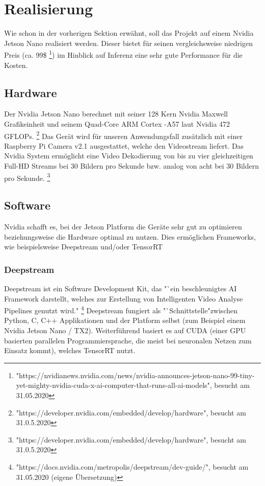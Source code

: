 \documentclass[a4paper,oneside,12pt]{report}
\begin{document}
	\chapter{Realisierung}
	\begin{onehalfspace}
		Wie schon in der vorherigen Sektion erwähnt, soll das Projekt auf einem Nvidia Jetson Nano realisiert werden. Dieser bietet für seinen vergleichsweise niedrigen Preis (ca. 99\$
		\footnote{"https://nvidianews.nvidia.com/news/nvidia-announces-jetson-nano-99-tiny-yet-mighty-nvidia-cuda-x-ai-computer-that-runs-all-ai-models", besucht am 31.05.2020})
		im Hinblick auf Inferenz eine sehr gute Performance für die Kosten.
		\section{Hardware}
		Der Nvidia Jetson Nano berechnet mit seiner 128 Kern Nvidia Maxwell Grafikeinheit und seinem Quad-Core ARM Cortex -A57 laut Nvidia 472 GFLOPs.
		\footnote{"https://developer.nvidia.com/embedded/develop/hardware", besucht am 31.0.5.2020}
		Das Gerät wird für unseren Anwendungsfall zusätzlich mit einer Raspberry Pi Camera v2.1 ausgestattet, welche den Videostream liefert. Das Nvidia System ermöglicht eine Video Dekodierung von bis zu vier gleichzeitigen Full-HD Streams bei 30 Bildern pro Sekunde bzw. analog von acht bei 30 Bildern pro Sekunde.
		\footnote{"https://developer.nvidia.com/embedded/develop/hardware", besucht am 31.0.5.2020}
		\section{Software}
		Nvidia schafft es, bei der Jetson Platform die Geräte sehr gut zu optimieren beziehungsweise die Hardware optimal zu nutzen. Dies ermöglichen Frameworks, wie beispielsweise Deepstream und/oder TensorRT
		\subsection{Deepstream}
		Deepstream ist ein Software Development Kit, das "`ein beschleunigtes AI Framework darstellt, welches zur Erstellung von Intelligenten Video Analyse Pipelines genutzt wird."
		\footnote{"https://docs.nvidia.com/metropolis/deepstream/dev-guide/", besucht am 31.05.2020 (eigene Übersetzung)}
		Deepstream fungiert als "`Schnittstelle"\space zwischen Python, C, C++ Applikationen und der Platform selbst (zum Beispiel einem Nvidia Jetson Nano / TX2).
		Weiterführend basiert es auf CUDA (einer GPU basierten parallelen Programmiersprache, die meist bei neuronalen Netzen zum Einsatz kommt), welches TensorRT nutzt.

\end{onehalfspace}
\end{document}
